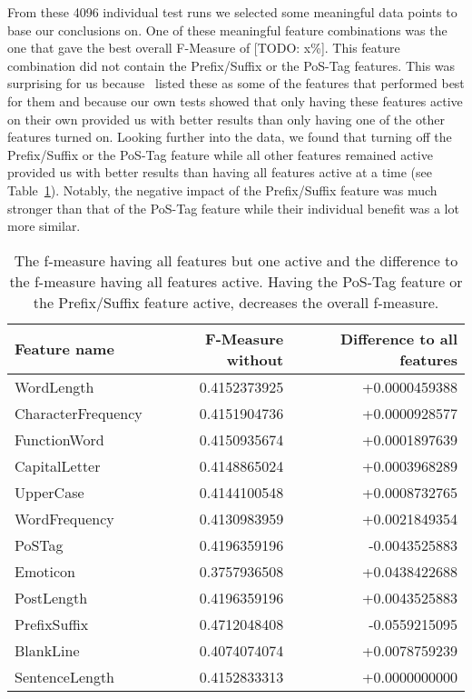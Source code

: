 From these 4096 individual test runs we selected some meaningful data points to base our conclusions on.
One of these meaningful feature combinations was the one that gave the best overall F-Measure of [TODO: x\%].
This feature combination did not contain the Prefix/Suffix or the PoS-Tag features.
This was surprising for us because~\cite{madigan2005author} listed these as some of the features that performed best for them and because our own tests showed that only having these features active on their own provided us with better results than only having one of the other features turned on.
Looking further into the data, we found that turning off the Prefix/Suffix or the PoS-Tag feature while all other features remained active provided us with better results than having all features active at a time (see Table~\ref{tab:feature_evaluation_1}).
Notably, the negative impact of the Prefix/Suffix feature was much stronger than that of the PoS-Tag feature while their individual benefit was a lot more similar.

\begin{table}[h]
	\begin{center}
    \begin{tabular}{l|r|r}
	Feature name & F-Measure without & Difference to all features \\ \hline
	WordLength & 0.4152373925 & +0.0000459388 \\ \hline
	CharacterFrequency & 0.4151904736 & +0.0000928577 \\ \hline
	FunctionWord  & 0.4150935674 & +0.0001897639 \\ \hline
	CapitalLetter & 0.4148865024 & +0.0003968289 \\ \hline
	UpperCase & 0.4144100548 & +0.0008732765 \\ \hline
	WordFrequency &	0.4130983959 & +0.0021849354 \\ \hline
	PoSTag & 0.4196359196 & -0.0043525883 \\ \hline
	Emoticon &	0.3757936508 & +0.0438422688 \\ \hline
	PostLength & 0.4196359196 & +0.0043525883 \\ \hline
	PrefixSuffix & 0.4712048408 & -0.0559215095 \\ \hline
	BlankLine & 0.4074074074 & +0.0078759239 \\ \hline
	SentenceLength & 0.4152833313 & +0.0000000000 \\
    \end{tabular}
    \end{center}
	\caption{The f-measure having all features but one active and the difference to the f-measure having all features active. Having the PoS-Tag feature or the Prefix/Suffix feature active, decreases the overall f-measure.}
	\label{tab:feature_evaluation_1}
\end{table}

